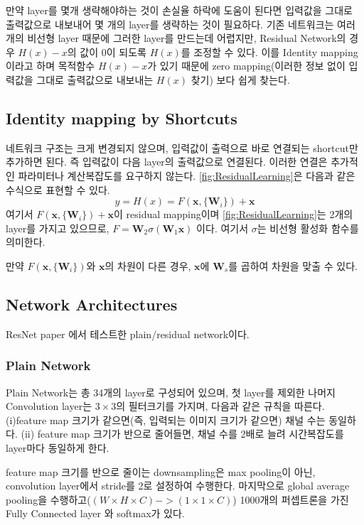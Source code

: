 \documentclass[extendedabs]{bmvc2k}
\begin{document}
만약 layer를 몇개 생략해야하는 것이 손실율 하락에 도움이 된다면 입력값을 그대로 출력값으로 내보내어 몇 개의 layer를 생략하는 것이 필요하다. 기존 네트워크는 여러개의 비선형 layer 때문에 그러한 layer를 만드는데 어렵지만, Residual Network의 경우 $H(x)-x$의 값이 0이 되도록 $H(x)$를 조정할 수 있다. 이를 Identity mapping이라고 하며 목적함수 $H(x)-x$가 있기 때문에 zero mapping(이러한 정보 없이 입력값을 그대로 출력값으로 내보내는 $H(x)$ 찾기) 보다 쉽게 찾는다.

\subsection{Identity mapping by Shortcuts}
네트워크 구조는 크게 변경되지 않으며, 입력값이 출력으로 바로 연결되는 shortcut만 추가하면 된다. 즉 입력값이 다음 layer의 출력값으로 연결된다. 이러한 연결은 추가적인 파라미터나 계산복잡도를 요구하지 않는다. \ref{fig:ResidualLearning}은 다음과 같은 수식으로 표현할 수 있다.
$$
y=H(x) = F(\textbf{x},\{ \textbf{W}_i \})+\textbf{x}
$$
여기서 $ F(\textbf{x},\{\textbf{W}_i\})+\textbf{x}$이 residual mapping이며 \ref{fig:ResidualLearning}는 2개의 layer를 가지고 있으므로, $F=\textbf{W}_2\sigma(\textbf{W}_1\textbf{x})$ 이다. 여기서 $\sigma$는 비선형 활성화 함수를 의미한다.

만약 $F(\textbf{x},\{ \textbf{W}_i \})$와 $\textbf{x}$의 차원이 다른 경우, $\textbf{x}$에 $\textbf{W}_s$를 곱하여 차원을 맞출 수 있다.

\subsection{Network Architectures}
ResNet paper\cite{resnet} 에서 테스트한 plain/residual network이다.
\subsubsection{Plain Network} \label{Plain Network}
Plain Network는 총 34개의 layer로 구성되어 있으며, 첫 layer를 제외한 나머지 Convolution layer는 $3\times3$의 필터크기를 가지며, 다음과 같은 규칙을 따른다. (i)feature map 크기가 같으면(즉, 입력되는 이미지 크기가 같으면) 채널 수는 동일하다. (ii) feature map 크기가 반으로 줄어들면, 채널 수를 2배로 늘려 시간복잡도를 layer마다 동일하게 한다. 

feature map 크기를 반으로 줄이는 downsampling은 max pooling이 아닌, convolution layer에서 stride를 2로 설정하여 수행한다. 마지막으로 global average pooling을 수행하고($(W\times H\times C) -> (1\times1\times C)$) 1000개의 퍼셉트론을 가진 Fully Connected layer 와 softmax가 있다.
\end{document}
